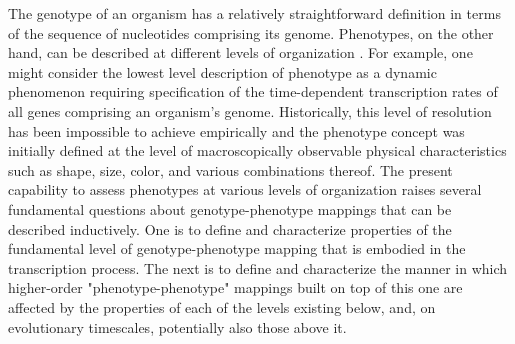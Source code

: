 The genotype of an organism has a relatively straightforward definition in terms of the sequence of nucleotides comprising its genome. Phenotypes, on the other hand, can be described at different levels of organization \cite{Stadler2001}. For example, one might consider the lowest level description of phenotype as a dynamic phenomenon requiring specification of the time-dependent transcription rates of all genes comprising an organism's genome. Historically, this level of resolution has been impossible to achieve empirically and the phenotype concept was initially defined at the level of macroscopically observable physical characteristics such as shape, size, color, and various combinations thereof. The present capability to assess phenotypes at various levels of organization raises several fundamental questions about genotype-phenotype mappings that can be described inductively. One is to define and characterize properties of the fundamental level of genotype-phenotype mapping that is embodied in the transcription process. The next is to define and characterize the manner in which higher-order "phenotype-phenotype" mappings built on top of this one are affected by the properties of each of the levels existing below, and, on evolutionary timescales, potentially also those above it.

